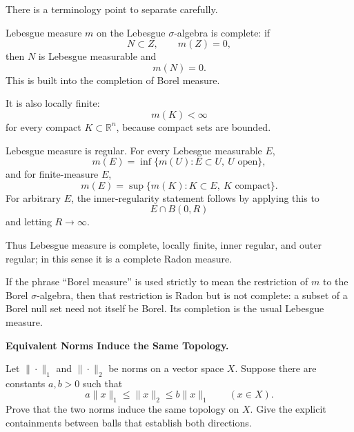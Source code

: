 \begin{solution}
There is a terminology point to separate carefully.

Lebesgue measure \(m\) on the Lebesgue \(\sigma\)-algebra is complete: if
\[
N\subset Z,
\qquad
m(Z)=0,
\]
then \(N\) is Lebesgue measurable and
\[
m(N)=0.
\]
This is built into the completion of Borel measure.

It is also locally finite:
\[
m(K)<\infty
\]
for every compact \(K\subset\mathbb R^n\), because compact sets are bounded.

Lebesgue measure is regular. For every Lebesgue measurable \(E\),
\[
m(E)
=
\inf\{m(U):E\subset U,\ U\text{ open}\},
\]
and for finite-measure \(E\),
\[
m(E)
=
\sup\{m(K):K\subset E,\ K\text{ compact}\}.
\]
For arbitrary \(E\), the inner-regularity statement follows by applying this to
\[
E\cap B(0,R)
\]
and letting \(R\to\infty\).

Thus Lebesgue measure is complete, locally finite, inner regular, and outer regular; in this sense it is a complete Radon measure.

If the phrase ``Borel measure'' is used strictly to mean the restriction of \(m\) to the Borel \(\sigma\)-algebra, then that restriction is Radon but is not complete: a subset of a Borel null set need not itself be Borel. Its completion is the usual Lebesgue measure.
\end{solution}


\begin{problem}[CP-II-0146]
\label{prob:cp-ii-0146}
\textbf{Equivalent Norms Induce the Same Topology.}

\hspace*{1.5em}Let \(\|\cdot\|_1\) and \(\|\cdot\|_2\) be norms on a vector space \(X\).
Suppose there are constants \(a,b>0\) such that
\[
a\|x\|_1\le\|x\|_2\le b\|x\|_1
\qquad(x\in X).
\]
Prove that the two norms induce the same topology on \(X\). Give the explicit
containments between balls that establish both directions.
\end{problem}

